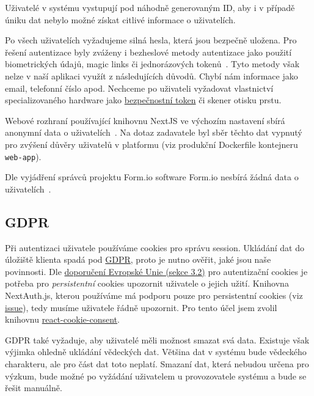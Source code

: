 Uživatelé v systému vystupují pod náhodně generovaným ID, aby i v případě úniku dat nebylo možné získat citlivé informace o uživatelích.

Po všech uživatelích vyžadujeme silná hesla, která jsou bezpečně uložena.
Pro řešení autentizace byly zváženy i bezheslové metody autentizace jako použití biometrických údajů, magic links či jednorázových tokenů~\cite{what-is-passworless}.
Tyto metody však nelze v naší aplikaci využít z následujících důvodů.
Chybí nám informace jako email, telefonní číslo apod.
Nechceme po uživateli vyžadovat vlastnictví specializovaného hardware jako \href{https://cs.wikipedia.org/wiki/Bezpe%C4%8Dnostn%C3%AD_token}{bezpečnostní token} či skener otisku prstu.

Webové rozhraní používající knihovnu NextJS ve výchozím nastavení sbírá anonymní data o uživatelích~\cite{nextjs-telemetry}.
Na dotaz zadavatele byl sběr těchto dat vypnutý pro zvýšení důvěry uživatelů v platformu (viz produkční Dockerfile kontejneru \lstinline{web-app}).

Dle vyjádření správců projektu Form.io software Form.io nesbírá žádná data o uživatelích~\cite{formio-telemetry-issue}.

\subsection{GDPR}\label{subsec:gdpr}

Při autentizaci uživatele používáme cookies pro správu session.
Ukládání dat do úložiště klienta spadá pod \href{https://eur-lex.europa.eu/eli/reg/2016/679/oj}{GDPR}, proto je nutno ověřit, jaké jsou naše povinnosti.
Dle \href{https://ec.europa.eu/justice/article-29/documentation/opinion-recommendation/files/2012/wp194_en.pdf}{doporučení Evropské Unie (sekce 3.2)} pro autentizační cookies je potřeba pro \emph{persistentní} cookies upozornit uživatele o jejich užití.
Knihovna NextAuth.js, kterou používáme má podporu pouze pro persistentní cookies (viz \href{https://github.com/nextauthjs/next-auth/issues/2534}{issue}), tedy musíme uživatele řádně upozornit.
Pro tento účel jsem zvolil knihovnu \href{https://www.npmjs.com/package/react-cookie-consent}{react-cookie-consent}.

GDPR také vyžaduje, aby uživatelé měli možnost smazat svá data.
Existuje však výjimka ohledně ukládání vědeckých dat.
Většina dat v systému bude vědeckého charakteru, ale pro část dat toto neplatí.
Smazaní dat, která nebudou určena pro výzkum, bude možné po vyžádání uživatelem u provozovatele systému a bude se řešit manuálně.


